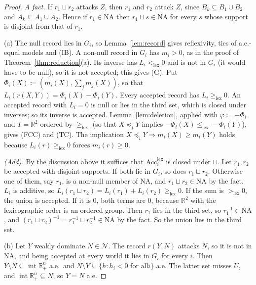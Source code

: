 \documentclass[11pt]{article}
\newcommand{\R}{\mathbb{R}}
\newcommand{\NN}{\mathcal{N}}
\newcommand{\Acc}{\mathrm{Acc}}
\newcommand{\Rpp}{\inter\R^n_{+}}
\DeclareMathOperator{\inter}{int}
\theoremstyle{plain}
\theoremstyle{definition}
\theoremstyle{remark}
\begin{document}
\begin{proof}
\emph{A fact.} If $r_1\sqcup r_2$ attacks $Z$, then $r_1$ and $r_2$ attack $Z$, since
$B_k\subseteq B_1\cup B_2$ and $A_k\subseteq A_1\cup A_2$. Hence if $r_1\in\mathrm{NA}$
then $r_1\sqcup s\in\mathrm{NA}$ for every $s$ whose support is disjoint from that of
$r_1$.

(a) The null record lies in $G_i$, so Lemma~\ref{lem:record} gives reflexivity, ties of
a.e.-equal models and (IB). A non-null record in $G_i$ has $m_i>0$, as in the proof of
Theorem~\ref{thm:reduction}(a). Its inverse has $L_i<_{\mathrm{lex}}0$ and is not in
$G_i$ (it would have to be null), so it is not accepted; this gives (G). Put
$\Phi_i(X)\coloneqq(m_i(X),\sum_jm_j(X))$, so that $L_i(r(X,Y))=\Phi_i(X)-\Phi_i(Y)$.
Every accepted record has $L_i\ge_{\mathrm{lex}}0$. An accepted record with $L_i=0$ is
null or lies in the third set, which is closed under inverses; so its inverse is
accepted. Lemma~\ref{lem:deletion}, applied with $\varphi\coloneqq-\Phi_i$ and $T=\R^2$
ordered by $\ge_{\mathrm{lex}}$ (so that $X\preceq_iY$ implies $-\Phi_i(X)\le_{\mathrm{lex}}
-\Phi_i(Y)$), gives (FCC) and (TC). The implication $X\preceq_iY
\Rightarrow m_i(X)\ge m_i(Y)$ holds because $L_i(r)\ge_{\mathrm{lex}}0$ forces
$m_i(r)\ge0$.

\emph{(Add).} By the discussion above it suffices that $\Acc^{\mathrm{lex}}_i$ is closed
under $\sqcup$. Let $r_1,r_2$ be accepted with disjoint supports. If both lie in $G_i$, so
does $r_1\sqcup r_2$. Otherwise one of them, say $r_1$, is a non-null member of
$\mathrm{NA}$, and $r_1\sqcup r_2\in\mathrm{NA}$ by the fact. $L_i$ is additive, so
$L_i(r_1\sqcup r_2)=L_i(r_1)+L_i(r_2)\ge_{\mathrm{lex}}0$. If the sum is
$>_{\mathrm{lex}}0$, the union is accepted. If it is $0$, both terms are $0$, because
$\R^2$ with the lexicographic order is an ordered group. Then $r_1$ lies in the third
set, so $r_1^{-1}\in\mathrm{NA}$, and $(r_1\sqcup r_2)^{-1}=r_1^{-1}\sqcup r_2^{-1}\in
\mathrm{NA}$ by the fact. So the union lies in the third set.

(b) Let $Y$ weakly dominate $N\in\NN$. The record $r(Y,N)$ attacks $N$, so it is not in
$\mathrm{NA}$, and being accepted at every world it lies in $G_i$ for every $i$. Then
$Y\setminus N\subseteq\Rpp$ a.e.\ and $N\setminus Y\subseteq\{h:h_i<0\text{ for all
}i\}$ a.e. The latter set misses $U$, and $\Rpp\subseteq N$; so $Y=N$ a.e.


\end{proof}
\end{document}

